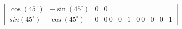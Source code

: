 \documentclass[preview]{standalone}
\begin{document}
\begin{align*}
\begin{bmatrix} \cos(45^{\circ}) & -\sin(45^{\circ}) & 0 & 0\\sin(45^{\circ}) & \cos(45^{\circ}) & 0 & 0\ 0 & 0 & 1 & 0\ 0 & 0 & 0 & 1\end{bmatrix}
\end{align*}
\end{document}
